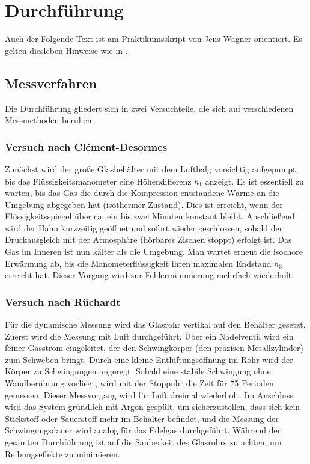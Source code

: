 \chapter{Durchführung} \label{ch:Durchfuehrung}

Auch der Folgende Text ist am Praktikumsskript von Jens Wagner orientiert. Es gelten diesleben Hinweise wie in  \cite{skriptPAP21,Duden}.
\section{Messverfahren} \label{sec:Messverfahren}
Die Durchführung gliedert sich in zwei Versuchteile, die sich auf verschiedenen Messmethoden beruhen.

\subsection{Versuch nach Clément-Desormes}
Zunächst wird der große Glasbehälter mit dem Luftbalg vorsichtig aufgepumpt, bis das Flüssigkeitsmanometer eine Höhendifferenz $h_1$ anzeigt. Es ist essentiell zu warten, bis das Gas die durch die Kompression entstandene Wärme an die Umgebung abgegeben hat (isothermer Zustand). Dies ist erreicht, wenn der Flüssigkeitsspiegel über ca. ein bis zwei Minuten konstant bleibt. 
Anschließend wird der Hahn kurzzeitig geöffnet und sofort wieder geschlossen, sobald der Druckausgleich mit der Atmosphäre (hörbares Zischen stoppt) erfolgt ist. Das Gas im Inneren ist nun kälter als die Umgebung. Man wartet erneut die isochore Erwärmung ab, bis die Manometerflüssigkeit ihren maximalen Endstand $h_3$ erreicht hat. Dieser Vorgang wird zur Fehlerminimierung mehrfach wiederholt.

\subsection{Versuch nach Rüchardt}
Für die dynamische Messung wird das Glasrohr vertikal auf den Behälter gesetzt. Zuerst wird die Messung mit Luft durchgeführt. Über ein Nadelventil wird ein feiner Gasstrom eingeleitet, der den Schwingkörper (den präzisen Metallzylinder) zum Schweben bringt. Durch eine kleine Entlüftungsöffnung im Rohr wird der Körper zu Schwingungen angeregt. 
Sobald eine stabile Schwingung ohne Wandberührung vorliegt, wird mit der Stoppuhr die Zeit für 75 Perioden gemessen. Dieser Messvorgang wird für Luft dreimal wiederholt. Im Anschluss wird das System gründlich mit Argon gespült, um sicherzustellen, dass sich kein Stickstoff oder Sauerstoff mehr im Behälter befindet, und die Messung der Schwingungsdauer wird analog für das Edelgas durchgeführt. Während der gesamten Durchführung ist auf die Sauberkeit des Glasrohrs zu achten, um Reibungseffekte zu minimieren.
